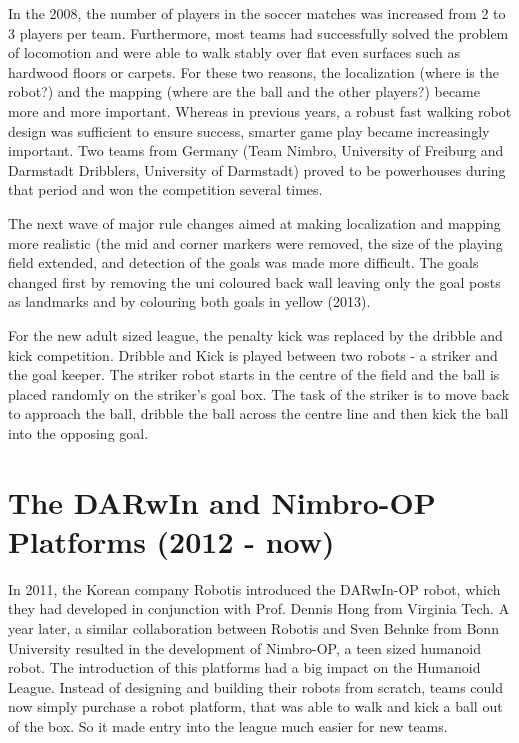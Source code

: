 \documentclass{llncs}
\begin{document}
In the 2008, the number of players in the soccer matches was increased
from 2 to 3 players per team. Furthermore, most teams had successfully
solved the problem of locomotion and were able to walk stably over
flat even surfaces such as hardwood floors or carpets. For these two
reasons, the localization (where is the robot?) and the mapping (where
are the ball and the other players?) became more and more
important. Whereas in previous years, a robust fast walking robot
design was sufficient to ensure success, smarter game play became
increasingly important. Two teams from Germany (Team Nimbro,
University of Freiburg and Darmstadt Dribblers, University of
Darmstadt) proved to be powerhouses during that period and won the
competition several times.

The next wave of major rule changes aimed at making localization and
mapping more realistic (the mid and corner markers were removed, the
size of the playing field extended, and detection of the goals was
made more difficult. The goals changed first by removing the uni
coloured back wall leaving only the goal posts as landmarks and by
colouring both goals in yellow (2013).

For the new adult sized league, the penalty kick was replaced by the
dribble and kick competition. Dribble and Kick is played between two
robots - a striker and the goal keeper. The striker robot starts in
the centre of the field and the ball is placed randomly on the
striker's goal box. The task of the striker is to move back to
approach the ball, dribble the ball across the centre line and then
kick the ball into the opposing goal.

\section{The DARwIn and Nimbro-OP Platforms (2012 - now)}
\label{sec:threeb}

In 2011, the Korean company Robotis introduced the DARwIn-OP robot,
which they had developed in conjunction with Prof. Dennis Hong from
Virginia Tech. A year later, a similar collaboration between Robotis
and Sven Behnke from Bonn University resulted in the development of
Nimbro-OP, a teen sized humanoid robot. The introduction of this
platforms had a big impact on the Humanoid League. Instead of
designing and building their robots from scratch, teams could now
simply purchase a robot platform, that was able to walk and kick a
ball out of the box. So it made entry into the league much easier for
new teams.
\end{document}
